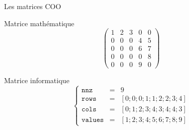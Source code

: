 \documentclass{beamer}
\begin{document}
  \begin{frame}{Les matrices COO}
    \begin{minipage}[c]{.30\linewidth}
      \begin{exampleblock}{Matrice mathématique}
        \bigskip
        $$
        \begin{pmatrix}
          1 & 2 & 3 & 0 & 0 \\
          0 & 0 & 0 & 4 & 5 \\
          0 & 0 & 0 & 6 & 7 \\
          0 & 0 & 0 & 0 & 8 \\
          0 & 0 & 0 & 9 & 0
        \end{pmatrix}
        $$
        \bigskip
      \end{exampleblock}
    \end{minipage} \hfill
    \begin{minipage}[c]{.60\linewidth}
      \begin{exampleblock}{Matrice informatique}
        \vspace{0.9cm}
        $$
        \left\{
          \begin{array}{lcl}
            \texttt{nnz} & = & 9 \\
            \texttt{rows} & = & [0;0;0;1;1;2;2;3;4] \\
            \texttt{cols} & = & [0;1;2;3;4;3;4;4;3] \\
            \texttt{values} & = & [1;2;3;4;5;6;7;8;9]
          \end{array}
        \right.
        $$
        \vspace{0.9cm}
      \end{exampleblock}
    \end{minipage}
  \end{frame}
  
\end{document}
